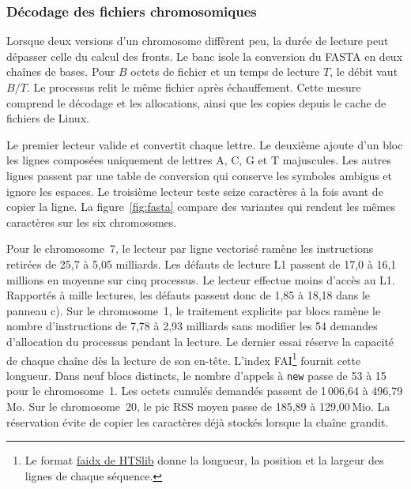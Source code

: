 \subsubsection{Décodage des fichiers chromosomiques}\label{sec:lecture}
Lorsque deux versions d'un chromosome diffèrent peu, la durée de lecture peut dépasser celle du calcul des fronts. Le banc isole la conversion du FASTA en deux chaînes de bases. Pour \(B\) octets de fichier et un temps de lecture \(T\), le débit vaut \(B/T\). Le processus relit le même fichier après échauffement. Cette mesure comprend le décodage et les allocations, ainsi que les copies depuis le cache de fichiers de Linux.

Le premier lecteur valide et convertit chaque lettre. Le deuxième ajoute d'un bloc les lignes composées uniquement de lettres A, C, G et T majuscules. Les autres lignes passent par une table de conversion qui conserve les symboles ambigus et ignore les espaces. Le troisième lecteur teste seize caractères à la fois avant de copier la ligne. La figure~\ref{fig:fasta} compare des variantes qui rendent les mêmes caractères sur les six chromosomes.

Pour le chromosome~7, le lecteur par ligne vectorisé ramène les instructions retirées de 25,7 à 5,05 milliards. Les défauts de lecture L1 passent de 17,0 à 16,1 millions en moyenne sur cinq processus. Le lecteur effectue moins d’accès au L1. Rapportés à mille lectures, les défauts passent donc de 1,85 à 18,18 dans le panneau c). Sur le chromosome~1, le traitement explicite par blocs ramène le nombre d’instructions de 7,78 à 2,93 milliards sans modifier les 54 demandes d'allocation du processus pendant la lecture.
Le dernier essai réserve la capacité de chaque chaîne dès la lecture de son en-tête. L'index FAI\footnote{Le format \href{https://www.htslib.org/doc/faidx.html}{faidx de HTSlib} donne la longueur, la position et la largeur des lignes de chaque séquence.} fournit cette longueur. Dans neuf blocs distincts, le nombre d'appels à \texttt{new} passe de 53 à 15 pour le chromosome~1. Les octets cumulés demandés passent de 1\,006,64 à 496,79\,Mo. Sur le chromosome~20, le pic RSS moyen passe de 185,89 à 129,00\,Mio. La réservation évite de copier les caractères déjà stockés lorsque la chaîne grandit.

